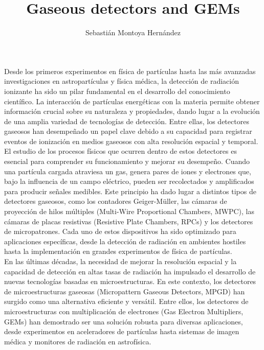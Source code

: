 \documentclass{article}
\title{\textbf{Gaseous detectors and GEMs} }
\author{Sebastián Montoya Hernández}
\begin{document}
\maketitle 
\setcounter{section}{0}
\noindent Desde los primeros experimentos en física de partículas hasta las más avanzadas investigaciones en astropartículas y física médica, la detección de radiación ionizante ha sido un pilar fundamental en el desarrollo del conocimiento científico. La interacción de partículas energéticas con la materia permite obtener información crucial sobre su naturaleza y propiedades, dando lugar a la evolución de una amplia variedad de tecnologías de detección. Entre ellas, los detectores gaseosos han desempeñado un papel clave debido a su capacidad para registrar eventos de ionización en medios gaseosos con alta resolución espacial y temporal.\\

\noindent El estudio de los procesos físicos que ocurren dentro de estos detectores es esencial para comprender su funcionamiento y mejorar su desempeño. Cuando una partícula cargada atraviesa un gas, genera pares de iones y electrones que, bajo la influencia de un campo eléctrico, pueden ser recolectados y amplificados para producir señales medibles. Este principio ha dado lugar a distintos tipos de detectores gaseosos, como los contadores Geiger-Müller, las cámaras de proyección de hilos múltiples (Multi-Wire Proportional Chambers, MWPC), las cámaras de placas resistivas (Resistive Plate Chambers, RPCs) y los detectores de micropatrones. Cada uno de estos dispositivos ha sido optimizado para aplicaciones específicas, desde la detección de radiación en ambientes hostiles hasta la implementación en grandes experimentos de física de partículas.\\

\noindent En las últimas décadas, la necesidad de mejorar la resolución espacial y la capacidad de detección en altas tasas de radiación ha impulsado el desarrollo de nuevas tecnologías basadas en microestructuras. En este contexto, los detectores de microestructuras gaseosas (Micropattern Gaseous Detectors, MPGD) han surgido como una alternativa eficiente y versátil. Entre ellos, los detectores de microestructuras con multiplicación de electrones (Gas Electron Multipliers, GEMs) han demostrado ser una solución robusta para diversas aplicaciones, desde experimentos en aceleradores de partículas hasta sistemas de imagen médica y monitores de radiación en astrofísica.\\
\end{document}
